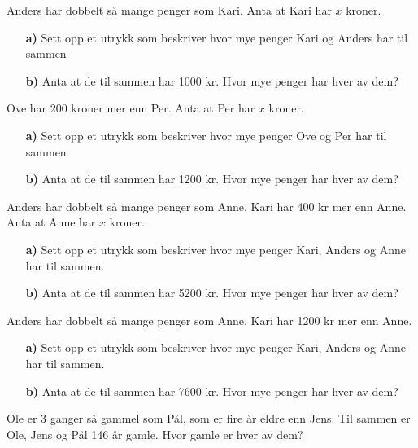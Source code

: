 \documentclass[a4, 11pt, twoside]{article}
\theoremstyle{definition}
\begin{document}
\begin{Exercise}
Anders har dobbelt så mange penger som
 Kari. Anta at Kari har $x$ kroner.
\begin{itemize}
 \item[\bf a)] Sett opp et utrykk som beskriver hvor mye penger Kari og Anders har til sammen
 \item[\bf b)] Anta at de til sammen har 1000 kr. Hvor mye penger har hver av dem?
\end{itemize}
\end{Exercise}

\begin{Exercise}
Ove har 200 kroner mer enn
 Per. Anta at Per har $x$ kroner.
\begin{itemize}
 \item[\bf a)] Sett opp et utrykk som beskriver hvor mye penger Ove og Per har til sammen
 \item[\bf b)] Anta at de til sammen har 1200 kr. Hvor mye penger har hver av dem?
\end{itemize}
\end{Exercise}

\begin{Exercise}
Anders har dobbelt så mange penger som
 Anne. Kari har 400 kr mer enn Anne. Anta at Anne har $x$ kroner.
\begin{itemize}
 \item[\bf a)] Sett opp et utrykk som beskriver hvor mye penger Kari, Anders og Anne har til 
 sammen.
 \item[\bf b)] Anta at de til sammen har 5200 kr. Hvor mye penger har hver av dem?
\end{itemize}
\end{Exercise}

\begin{Exercise}
Anders har dobbelt så mange penger som Anne. 
Kari har 1200 kr mer enn Anne.
\begin{itemize}
 \item[\bf a)] Sett opp et utrykk som beskriver hvor mye penger Kari, Anders og Anne har til 
 sammen.
 \item[\bf b)] Anta at de til sammen har 7600 kr. Hvor mye penger har hver av dem?
\end{itemize}
\end{Exercise}

\begin{Exercise}
  Ole er 3 ganger så gammel som Pål, som er fire år eldre enn Jens.
  Til sammen er Ole, Jens og Pål 146 år gamle. Hvor gamle er hver av dem?
\end{Exercise}
\end{document}
